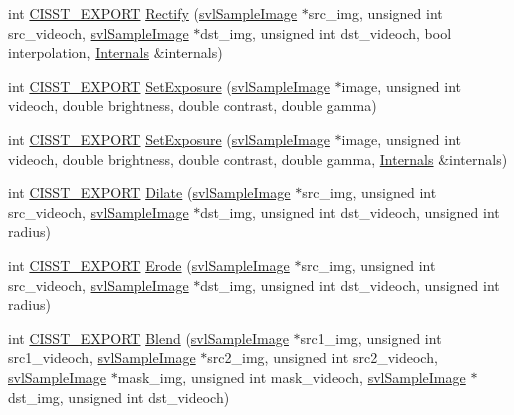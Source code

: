 \begin{DoxyCompactItemize}
\item 
int \hyperlink{cmn_export_macros_8h_a99393e0c3ac434b2605235bbe20684f8}{C\+I\+S\+S\+T\+\_\+\+E\+X\+P\+O\+R\+T} \hyperlink{namespacesvl_image_processing_aae74cfc118a2828f66163464fd418274}{Rectify} (\hyperlink{classsvl_sample_image}{svl\+Sample\+Image} $\ast$src\+\_\+img, unsigned int src\+\_\+videoch, \hyperlink{classsvl_sample_image}{svl\+Sample\+Image} $\ast$dst\+\_\+img, unsigned int dst\+\_\+videoch, bool interpolation, \hyperlink{classsvl_image_processing_1_1_internals}{Internals} \&internals)
\item 
int \hyperlink{cmn_export_macros_8h_a99393e0c3ac434b2605235bbe20684f8}{C\+I\+S\+S\+T\+\_\+\+E\+X\+P\+O\+R\+T} \hyperlink{namespacesvl_image_processing_ac0f716d58a6015a9648836a883e1fb32}{Set\+Exposure} (\hyperlink{classsvl_sample_image}{svl\+Sample\+Image} $\ast$image, unsigned int videoch, double brightness, double contrast, double gamma)
\item 
int \hyperlink{cmn_export_macros_8h_a99393e0c3ac434b2605235bbe20684f8}{C\+I\+S\+S\+T\+\_\+\+E\+X\+P\+O\+R\+T} \hyperlink{namespacesvl_image_processing_ae8acb9198b94108a07bbf0579316658f}{Set\+Exposure} (\hyperlink{classsvl_sample_image}{svl\+Sample\+Image} $\ast$image, unsigned int videoch, double brightness, double contrast, double gamma, \hyperlink{classsvl_image_processing_1_1_internals}{Internals} \&internals)
\item 
int \hyperlink{cmn_export_macros_8h_a99393e0c3ac434b2605235bbe20684f8}{C\+I\+S\+S\+T\+\_\+\+E\+X\+P\+O\+R\+T} \hyperlink{namespacesvl_image_processing_aaac2f4f8efbbb642c2957d91d54a2fac}{Dilate} (\hyperlink{classsvl_sample_image}{svl\+Sample\+Image} $\ast$src\+\_\+img, unsigned int src\+\_\+videoch, \hyperlink{classsvl_sample_image}{svl\+Sample\+Image} $\ast$dst\+\_\+img, unsigned int dst\+\_\+videoch, unsigned int radius)
\item 
int \hyperlink{cmn_export_macros_8h_a99393e0c3ac434b2605235bbe20684f8}{C\+I\+S\+S\+T\+\_\+\+E\+X\+P\+O\+R\+T} \hyperlink{namespacesvl_image_processing_abaa033a40ea75268ed95876ba061a7b5}{Erode} (\hyperlink{classsvl_sample_image}{svl\+Sample\+Image} $\ast$src\+\_\+img, unsigned int src\+\_\+videoch, \hyperlink{classsvl_sample_image}{svl\+Sample\+Image} $\ast$dst\+\_\+img, unsigned int dst\+\_\+videoch, unsigned int radius)
\item 
int \hyperlink{cmn_export_macros_8h_a99393e0c3ac434b2605235bbe20684f8}{C\+I\+S\+S\+T\+\_\+\+E\+X\+P\+O\+R\+T} \hyperlink{namespacesvl_image_processing_adbdd2812201b8085d9f4a37cdd2858a7}{Blend} (\hyperlink{classsvl_sample_image}{svl\+Sample\+Image} $\ast$src1\+\_\+img, unsigned int src1\+\_\+videoch, \hyperlink{classsvl_sample_image}{svl\+Sample\+Image} $\ast$src2\+\_\+img, unsigned int src2\+\_\+videoch, \hyperlink{classsvl_sample_image}{svl\+Sample\+Image} $\ast$mask\+\_\+img, unsigned int mask\+\_\+videoch, \hyperlink{classsvl_sample_image}{svl\+Sample\+Image} $\ast$dst\+\_\+img, unsigned int dst\+\_\+videoch)

\end{DoxyCompactItemize}
